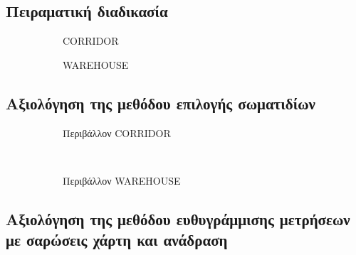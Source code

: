 \subsection{Πειραματική διαδικασία}

\begin{figure}[h]\centering
  \begin{subfigure}{0.49\linewidth}\centering
    \hspace{-1.75cm}
    
    \caption{\small CORRIDOR}
    \label{}
  \end{subfigure}
  \begin{subfigure}{0.49\linewidth} \centering
    
    \caption{\small WAREHOUSE}
    \label{}
  \end{subfigure}
\caption{}
\label{}
\end{figure}

\subsection{Αξιολόγηση της μεθόδου επιλογής σωματιδίων}

\begin{figure}[h]
  \begin{subfigure}{\linewidth}
  \hspace{-1.25cm}
    
    \vspace{0.3cm}
    \caption{Περιβάλλον CORRIDOR}
    \label{}
  \end{subfigure}\\
  \begin{subfigure}{\linewidth}\vspace{0.5cm}
    \hspace{-1.25cm}
    
    \vspace{0.3cm}
    \caption{Περιβάλλον WAREHOUSE}
    \label{}
    \end{subfigure}
\caption{}
\label{}
\end{figure}


\subsection{Αξιολόγηση της μεθόδου ευθυγράμμισης μετρήσεων με σαρώσεις χάρτη και ανάδραση}


